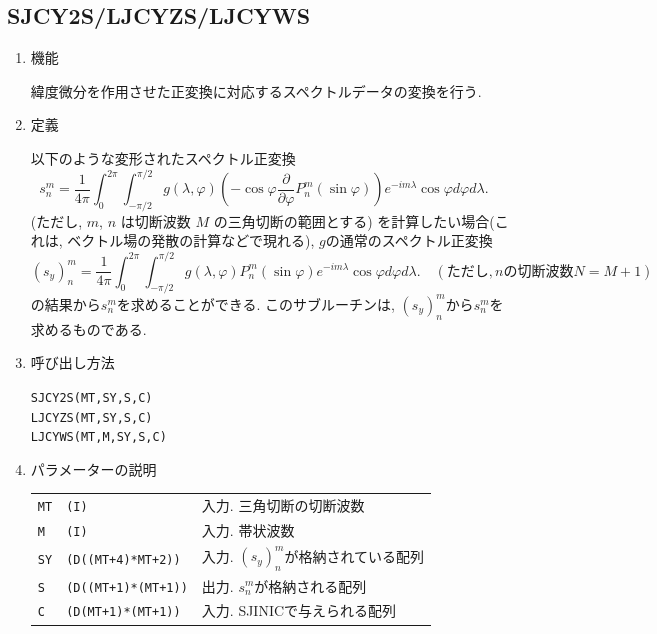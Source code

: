 \documentclass[a4j]{jarticle}
\begin{document}

\subsection{SJCY2S/LJCYZS/LJCYWS}

\begin{enumerate}

\item 機能 

緯度微分を作用させた正変換に対応するスペクトルデータの変換を行う.

\item 定義

以下のような変形されたスペクトル正変換
\begin{equation}
s^m_n=\frac1{4\pi}\int^{2\pi}_0\int^{\pi/2}_{-\pi/2}
g(\lambda,\varphi)
\left(-\cos\varphi\frac{\partial}{\partial\varphi}P^m_n(\sin\varphi)\right)
e^{-im\lambda}\cos\varphi d\varphi
d\lambda .
\quad 
\end{equation}
(ただし, $m$, $n$ は切断波数 $M$ の三角切断の範囲とする)
を計算したい場合(これは, ベクトル場の発散の計算などで現れる), 
$g$の通常のスペクトル正変換
\begin{equation}
(s_y)^m_n=\frac1{4\pi}\int^{2\pi}_0\int^{\pi/2}_{-\pi/2}
g(\lambda,\varphi)
P^m_n(\sin\varphi)
e^{-im\lambda}\cos\varphi d\varphi
d\lambda .
\quad (ただし, n の切断波数 N=M+1)
\end{equation}
の結果から$s^m_n$を求めることができる. 
このサブルーチンは, $(s_y)^m_n$から$s^m_n$を求めるものである.

\item 呼び出し方法 

{\tt SJCY2S(MT,SY,S,C)}\\
{\tt LJCYZS(MT,SY,S,C)}\\
{\tt LJCYWS(MT,M,SY,S,C)}
  
\item パラメーターの説明

\begin{tabular}{lll}
{\tt MT} & {\tt (I)} & 入力. 三角切断の切断波数\\
{\tt M} & {\tt (I)} & 入力. 帯状波数\\
{\tt SY} & {\tt (D((MT+4)*MT+2))} & 入力. $(s_y)^m_n$が格納されている配列\\
{\tt S} & {\tt (D((MT+1)*(MT+1))} & 出力. $s^m_n$が格納される配列\\
{\tt C} & {\tt (D(MT+1)*(MT+1))} & 入力. SJINICで与えられる配列
\end{tabular}


\end{enumerate}
\end{document}
